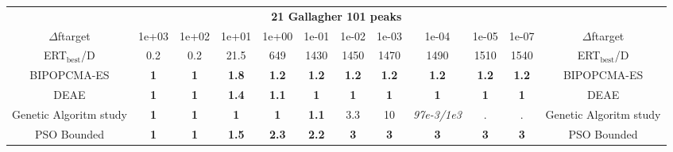\begin{tabular}{cccccccccccc}
 & \multicolumn{10}{c}{{\normalsize \textbf{21 Gallagher 101 peaks}}}\\
$\Delta$ftarget& 1e+03& 1e+02& 1e+01& 1e+00& 1e-01& 1e-02& 1e-03& 1e-04& 1e-05& 1e-07 & $\Delta$ftarget \\
ERT$_{\textrm{best}}$/D& 0.2& 0.2& 21.5& 649& 1430& 1450& 1470& 1490& 1510& 1540 & ERT$_{\textrm{best}}$/D \\
\hline
BIPOPCMA-ES & \textbf{1} & \textbf{1} & \textbf{1.8} & \textbf{1.2} & \textbf{1.2} & \textbf{1.2} & \textbf{1.2} & \textbf{1.2} & \textbf{1.2} & \textbf{1.2} & BIPOPCMA-ES \cite{add_an_entry_for_BIPOPCMA-ES_in_bbob.bib}\\
DEAE & \textbf{1} & \textbf{1} & \textbf{1.4} & \textbf{1.1} & \textbf{1} & \textbf{1} & \textbf{1} & \textbf{1} & \textbf{1} & \textbf{1} & DEAE \cite{add_an_entry_for_DEAE_in_bbob.bib}\\
Genetic Algoritm study & \textbf{1} & \textbf{1} & \textbf{1} & \textbf{1} & \textbf{1.1} & 3.3 & 10 & \textit{97e-3}\textit{/1e3} & . & . & Genetic Algoritm study \cite{add_an_entry_for_Genetic Algoritm study_in_bbob.bib}\\
PSO Bounded & \textbf{1} & \textbf{1} & \textbf{1.5} & \textbf{2.3} & \textbf{2.2} & \textbf{3} & \textbf{3} & \textbf{3} & \textbf{3} & \textbf{3} & PSO Bounded \cite{add_an_entry_for_PSO Bounded_in_bbob.bib}
\end{tabular}
